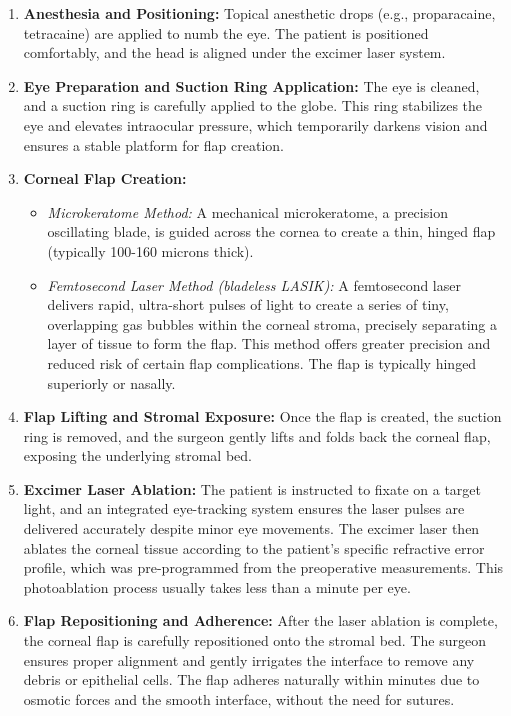 \begin{enumerate}
  \item \textbf{Anesthesia and Positioning:} Topical anesthetic drops (e.g., proparacaine, tetracaine) are applied to numb the eye. The patient is positioned comfortably, and the head is aligned under the excimer laser system.
  
  \item \textbf{Eye Preparation and Suction Ring Application:} The eye is cleaned, and a suction ring is carefully applied to the globe. This ring stabilizes the eye and elevates intraocular pressure, which temporarily darkens vision and ensures a stable platform for flap creation.
  
  \item \textbf{Corneal Flap Creation:}
      \begin{itemize}
        \item \textit{Microkeratome Method:} A mechanical microkeratome, a precision oscillating blade, is guided across the cornea to create a thin, hinged flap (typically 100-160 microns thick).
        
        \item \textit{Femtosecond Laser Method (bladeless LASIK):} A femtosecond laser delivers rapid, ultra-short pulses of light to create a series of tiny, overlapping gas bubbles within the corneal stroma, precisely separating a layer of tissue to form the flap. This method offers greater precision and reduced risk of certain flap complications. The flap is typically hinged superiorly or nasally.
      \end{itemize}
  
  \item \textbf{Flap Lifting and Stromal Exposure:} Once the flap is created, the suction ring is removed, and the surgeon gently lifts and folds back the corneal flap, exposing the underlying stromal bed.
  
  \item \textbf{Excimer Laser Ablation:} The patient is instructed to fixate on a target light, and an integrated eye-tracking system ensures the laser pulses are delivered accurately despite minor eye movements. The excimer laser then ablates the corneal tissue according to the patient's specific refractive error profile, which was pre-programmed from the preoperative measurements. This photoablation process usually takes less than a minute per eye.
  
  \item \textbf{Flap Repositioning and Adherence:} After the laser ablation is complete, the corneal flap is carefully repositioned onto the stromal bed. The surgeon ensures proper alignment and gently irrigates the interface to remove any debris or epithelial cells. The flap adheres naturally within minutes due to osmotic forces and the smooth interface, without the need for sutures.
  

\end{enumerate}
